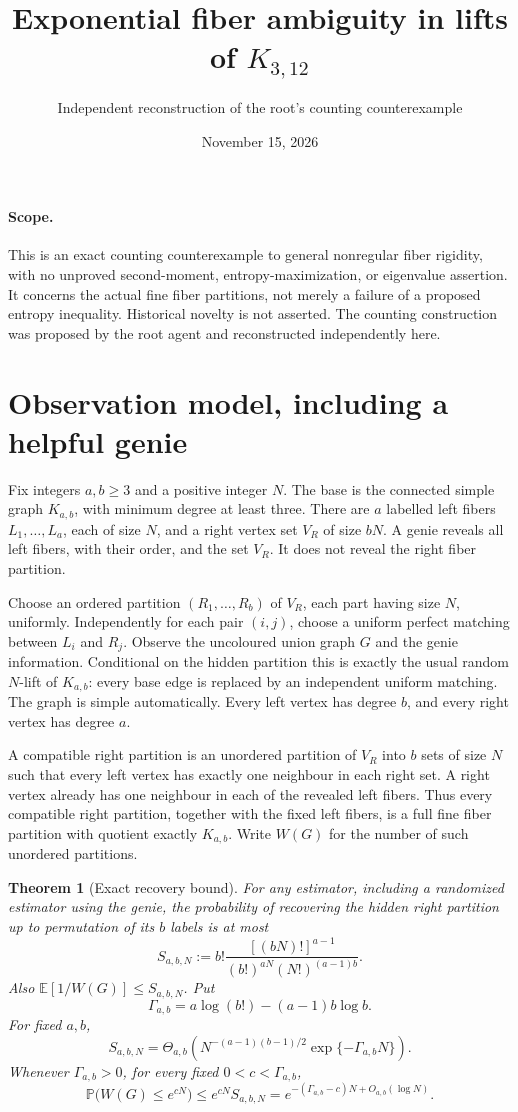 \documentclass[11pt]{article}
\title{Exponential fiber ambiguity in lifts of $K_{3,12}$}
\author{Independent reconstruction of the root's counting counterexample}
\date{November 15, 2026}
\newtheorem{theorem}{Theorem}
\newcommand{\Prb}{\mathbb P}
\newcommand{\E}{\mathbb E}
\begin{document}
\maketitle

\paragraph{Scope.}
This is an exact counting counterexample to general nonregular
fiber rigidity, with no unproved second-moment, entropy-maximization,
or eigenvalue assertion. It concerns the actual fine fiber partitions,
not merely a failure of a proposed entropy inequality. Historical
novelty is not asserted. The counting construction was proposed by the
root agent and reconstructed independently here.

\section{Observation model, including a helpful genie}
Fix integers $a,b\ge3$ and a positive integer $N$. The base is the
connected simple graph $K_{a,b}$, with minimum degree at least three.
There are $a$ labelled left fibers $L_1,\ldots,L_a$, each of size $N$,
and a right vertex set $V_R$ of size $bN$. A genie reveals all left
fibers, with their order, and the set $V_R$. It does not reveal the
right fiber partition.

Choose an ordered partition $(R_1,\ldots,R_b)$ of $V_R$, each part
having size $N$, uniformly. Independently for each pair $(i,j)$,
choose a uniform perfect matching between $L_i$ and $R_j$.
Observe the uncoloured union graph $G$ and the genie information.
Conditional on the hidden partition this is exactly the usual random
$N$-lift of $K_{a,b}$: every base edge is replaced by an independent
uniform matching. The graph is simple automatically. Every left
vertex has degree $b$, and every right vertex has degree $a$.

A compatible right partition is an unordered partition of $V_R$ into
$b$ sets of size $N$ such that every left vertex has exactly one
neighbour in each right set. A right vertex already has one neighbour
in each of the revealed left fibers. Thus every compatible right
partition, together with the fixed left fibers, is a full fine fiber
partition with quotient exactly $K_{a,b}$. Write $W(G)$ for the number
of such unordered partitions.

\begin{theorem}[Exact recovery bound]\label{thm:count}
For any estimator, including a randomized estimator using the genie,
the probability of recovering the hidden right partition up to
permutation of its $b$ labels is at most
\[
 S_{a,b,N}:=
 b!\frac{[(bN)!]^{a-1}}
 {(b!)^{aN}(N!)^{(a-1)b}}.
\]
Also $\E[1/W(G)]\le S_{a,b,N}$.
Put
\[
 \Gamma_{a,b}=a\log(b!)-(a-1)b\log b.
\]
For fixed $a,b$,
\[
 S_{a,b,N}=
 \Theta_{a,b}\!\left(
 N^{-(a-1)(b-1)/2}\exp\{-\Gamma_{a,b}N\}\right).
\]
Whenever $\Gamma_{a,b}>0$, for every fixed $0<c<\Gamma_{a,b}$,
\[
 \Prb\bigl(W(G)\le e^{cN}\bigr)
 \le e^{cN}S_{a,b,N}=e^{-(\Gamma_{a,b}-c)N+O_{a,b}(\log N)}.
\]
\end{theorem}
\end{document}
